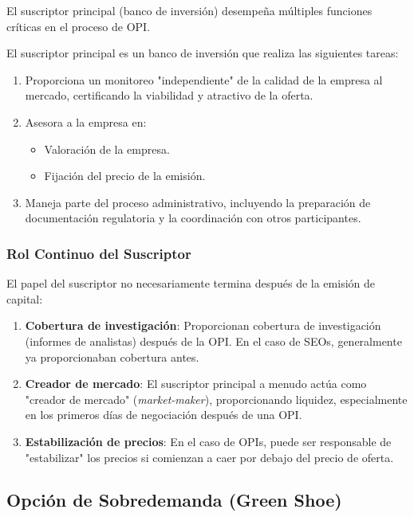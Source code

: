 El suscriptor principal (banco de inversión) desempeña múltiples funciones críticas en el proceso de OPI.

\begin{definicion}
El suscriptor principal es un banco de inversión que realiza las siguientes tareas:
\begin{enumerate}
\item Proporciona un monitoreo "independiente" de la calidad de la empresa al mercado, certificando la viabilidad y atractivo de la oferta.
\item Asesora a la empresa en:
   \begin{itemize}
   \item Valoración de la empresa.
   \item Fijación del precio de la emisión.
   \end{itemize}
\item Maneja parte del proceso administrativo, incluyendo la preparación de documentación regulatoria y la coordinación con otros participantes.
\end{enumerate}
\end{definicion}

\subsubsection{Rol Continuo del Suscriptor}

El papel del suscriptor no necesariamente termina después de la emisión de capital:

\begin{enumerate}
\item \textbf{Cobertura de investigación}: Proporcionan cobertura de investigación (informes de analistas) después de la OPI. En el caso de SEOs, generalmente ya proporcionaban cobertura antes.
\item \textbf{Creador de mercado}: El suscriptor principal a menudo actúa como "creador de mercado" (\textit{market-maker}), proporcionando liquidez, especialmente en los primeros días de negociación después de una OPI.
\item \textbf{Estabilización de precios}: En el caso de OPIs, puede ser responsable de "estabilizar" los precios si comienzan a caer por debajo del precio de oferta.
\end{enumerate}

\subsection{Opción de Sobredemanda (Green Shoe)}

